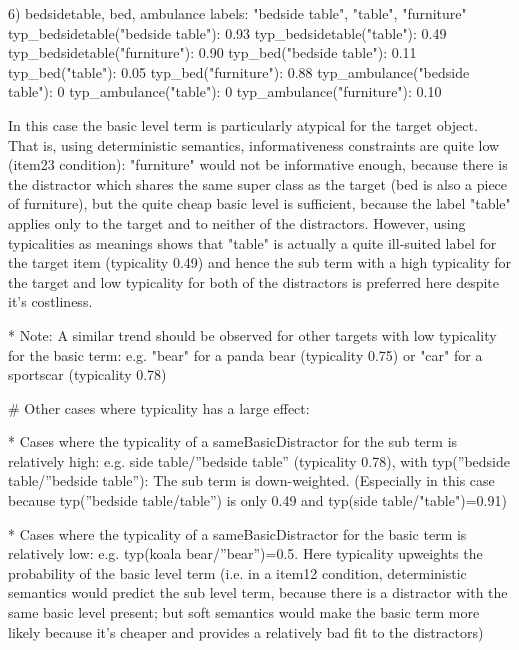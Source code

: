 6) bedsidetable, bed, ambulance
	labels: "bedside table", "table", "furniture"
	typ_bedsidetable("bedside table"): 0.93
	typ_bedsidetable("table"): 0.49
	typ_bedsidetable("furniture"): 0.90
	typ_bed("bedside table"): 0.11
	typ_bed("table"): 0.05
	typ_bed("furniture"): 0.88
	typ_ambulance("bedside table"): 0
	typ_ambulance("table"): 0
	typ_ambulance("furniture"): 0.10

	In this case the basic level term is particularly atypical for the target object. That is, using deterministic semantics, informativeness constraints are quite low (item23 condition): "furniture" would not be informative enough, because there is the distractor which shares the same super class as the target (bed is also a piece of furniture), but the quite cheap basic level is sufficient, because the label "table" applies only to the target and to neither of the distractors. However, using typicalities as meanings shows that "table" is actually a quite ill-suited label for the target item (typicality 0.49) and hence the sub term with a high typicality for the target and low typicality for both of the distractors is preferred here despite it's costliness.

	* Note: A similar trend should be observed for other targets with low typicality for the basic term: e.g. "bear" for a panda bear (typicality 0.75) or "car" for a sportscar (typicality 0.78)



	# Other cases where typicality has a large effect:

	* Cases where the typicality of a sameBasicDistractor for the sub term is relatively high: e.g. side table/”bedside table” (typicality 0.78), with typ(”bedside table/”bedside table”): The sub term is down-weighted. (Especially in this case because typ(”bedside table/table”) is only 0.49 and typ(side table/"table")=0.91)

	* Cases where the typicality of a sameBasicDistractor for the basic term is relatively low: e.g. typ(koala bear/”bear”)=0.5. Here typicality upweights the probability of the basic level term (i.e. in a item12 condition, deterministic semantics would predict the sub level term, because there is a distractor with the same basic level present; but soft semantics would make the basic term more likely because it's cheaper and provides a relatively bad fit to the distractors)


